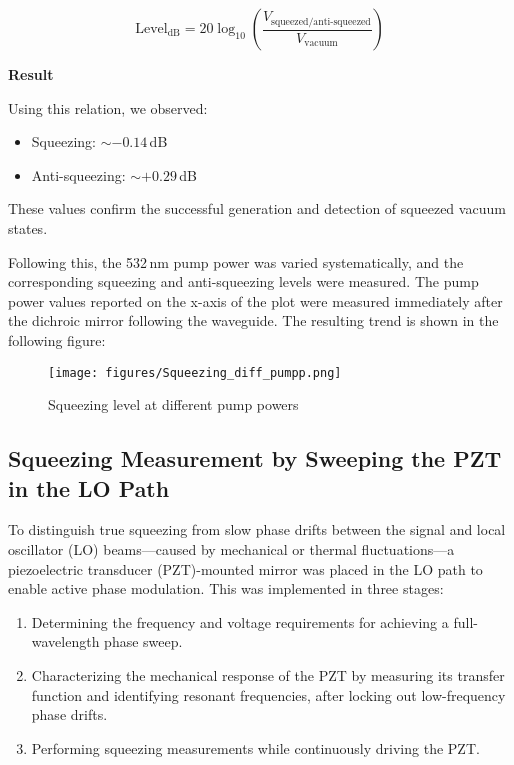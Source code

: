 \documentclass[colorlinks=true,pdfstartview=FitV,linkcolor=blue,
citecolor=red,urlcolor=magenta]{ligodoc}
\begin{document}
\[
\text{Level}_{\text{dB}} = 20 \log_{10} \left( \frac{V_{\text{squeezed/anti-squeezed}}}{V_{\text{vacuum}}} \right)
\]

\textbf{Result} 
 
Using this relation, we observed:
\begin{itemize}
    \item Squeezing: $\sim -0.14$\,dB  
    \item Anti-squeezing: $\sim +0.29$\,dB
\end{itemize}
These values confirm the successful generation and detection of squeezed vacuum states.

\vspace{0.5em}

Following this, the 532\,nm pump power was varied systematically, and the corresponding squeezing and anti-squeezing levels were measured. The pump power values reported on the x-axis of the plot were measured immediately after the dichroic mirror following the waveguide. The resulting trend is shown in the following figure:

\begin{figure}[H]
    \centering
    \texttt{[image: figures/Squeezing\_diff\_pumpp.png]}
   \caption{ Squeezing level at  different pump powers}
    \label{fig:enter-label}
\end{figure}

\subsection{Squeezing Measurement by Sweeping the PZT in the LO Path}

To distinguish true squeezing from slow phase drifts between the signal and local oscillator (LO) beams—caused by mechanical or thermal fluctuations—a piezoelectric transducer (PZT)-mounted mirror was placed in the LO path to enable active phase modulation. This was implemented in three stages:

\begin{enumerate}
    \item Determining the frequency and voltage requirements for achieving a full-wavelength phase sweep.
    \item Characterizing the mechanical response of the PZT by measuring its transfer function and identifying resonant frequencies, after locking out low-frequency phase drifts.
    \item Performing squeezing measurements while continuously driving the PZT.
\end{enumerate}
\end{document}
